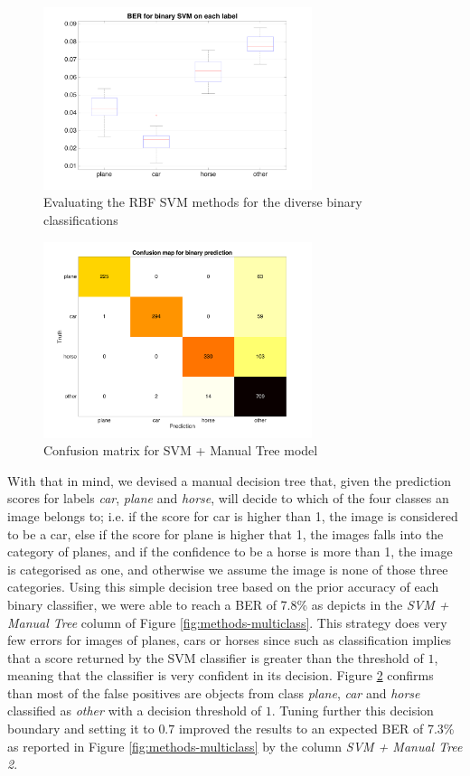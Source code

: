 \documentclass{article} %
\begin{document}
\begin{figure}[h]
	\center
	\includegraphics[width=0.7\textwidth]{figures/binaries_svm}
    \caption{Evaluating the RBF SVM methods for the diverse binary classifications}
  	\label{fig:svm-binaries}
\end{figure}

\begin{figure}[h]
	\center
  	\includegraphics[width=0.7\textwidth]{figures/confusion_map}
    \caption{Confusion matrix for SVM + Manual Tree model}
  	\label{fig:confusion}
\end{figure}

With that in mind, we devised a manual decision tree that, given the prediction scores for labels \textit{car}, \textit{plane} and \textit{horse}, will decide to which of the four classes an image belongs to; i.e. if the score for car is higher than 1, the image is considered to be a car, else if the score for plane is higher that 1, the images falls into the category of planes, and if the confidence to be a horse is more than 1, the image is categorised as one, and otherwise we assume the image is none of those three categories. Using this simple decision tree based on the prior accuracy of each binary classifier, we were able to reach a BER of 7.8\% as depicts in the \textit{SVM + Manual Tree} column of Figure \ref{fig:methods-multiclass}. This strategy does very few errors for images of planes, cars or horses since such as classification implies that a score returned by the SVM classifier is greater than the threshold of $1$, meaning that the classifier is very confident in its decision. Figure \ref{fig:confusion} confirms than most of the false positives are objects from class \textit{plane}, \textit{car} and \textit{horse} classified as \textit{other} with a decision threshold of $1$.
Tuning further this decision boundary and setting it to $0.7$ improved the results to an expected BER of 7.3\% as reported in Figure \ref{fig:methods-multiclass} by the column \textit{SVM + Manual Tree 2}.
\end{document}

